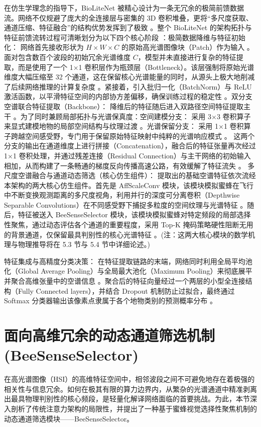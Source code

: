 在仿生学理念的指导下，BioLiteNet 被精心设计为一条无冗余的极简前馈数据流。网络不仅规避了庞大的全连接层与密集的 3D 卷积堆叠，更将“多尺度获取、通道压缩、特征融合”的结构优势发挥到了极致 。整个 BioLiteNet 的架构拓扑与特征前馈流转过程可清晰划分为以下四个核心阶段 ：极简数据降维与特征初始化：
网络首先接收形状为 $H \times W \times C$ 的原始高光谱图像块（Patch）作为输入 。面对包含数百个波段的初始冗余光谱维度 $C$，模型并未直接进行复杂的特征提取，而是使用了一个 1×1 卷积层作为瓶颈层（Bottleneck）。该层强制将原始光谱维度大幅压缩至 32 个通道，这在保留核心光谱能量的同时，从源头上极大地削减了后续网络推理的计算复杂度 。紧接着，引入批归一化（BatchNorm）与 ReLU 激活函数，以平滑特征空间的内部协方差偏移，确保训练过程的稳定性 。双分支空谱联合特征提取（Backbone）：
降维后的特征随后进入双路径空间特征提取主干 。为了同时兼顾局部拓扑与光谱保真度：空间建模分支： 采用 3×3 卷积算子来显式建模地物的局部空间结构与纹理过渡 。光谱保留分支： 采用 1×1 卷积算子跨越空间感受野，专门用于保留原始特征映射中纯粹的光谱响应模式 。
这两个分支的输出在通道维度上进行拼接（Concatenation），融合后的特征张量再次经过 1×1 卷积处理，并通过残差连接（Residual Connection）与主干网络的初始输入相加，从而构建了一条畅通的梯度反向传播高速公路，有效缓解了特征流失 。
多尺度空谱融合与通道动态筛选（核心仿生组件）：
提取出的基础空谱特征依次流经本架构的两大核心仿生组件。首先是 AffScaleConv 模块，该模块模拟蜜蜂在飞行中不断变换观测距离的多尺度视角，利用并行的深度可分离卷积（Depthwise Separable Convolutions）在不同感受野下捕捉多粒度的空间纹理与光谱特征 。随后，特征被送入 BeeSenseSelector 模块，该模块模拟蜜蜂对特定频段的局部选择性聚焦，通过动态评估各个通道的重要程度，采用 Top-K 掩码策略硬性阻断无用的背景通道，仅保留最具判别性的核心光谱特征 。(注：这两大核心模块的数学机理与物理推导将在 5.3 节与 5.4 节中详细论述。)

特征集成与高精度分类决策：
在特征提取链路的末端，网络同时利用全局平均池化（Global Average Pooling）与全局最大池化（Maximum Pooling）来彻底展平并聚合高维张量中的空谱信息 。聚合后的特征向量经过一个两层的小型全连接结构（Fully Connected layers），并结合 Dropout 机制防止过拟合，最终通过 Softmax 分类器输出该像素点隶属于各个地物类别的预测概率分布 。

\section{面向高维冗余的动态通道筛选机制 (BeeSenseSelector)}
在高光谱图像（HSI）的高维特征空间中，相邻波段之间不可避免地存在着极强的相关性与信息冗余。如何在极其有限的算力边界内，从繁杂的光谱通道中精准剥离出最具物理判别性的核心频段，是轻量化解译网络面临的首要挑战。为此，本节深入剖析了传统注意力架构的局限性，并提出了一种基于蜜蜂视觉选择性聚焦机制的动态通道筛选模块——BeeSenseSelector。

